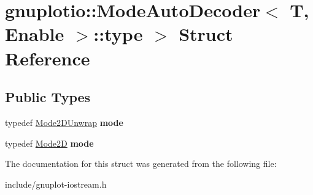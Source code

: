 \hypertarget{structgnuplotio_1_1ModeAutoDecoder_1_1type_01_4}{}\section{gnuplotio\+:\+:Mode\+Auto\+Decoder$<$ T, Enable $>$\+:\+:type $>$ Struct Reference}
\label{structgnuplotio_1_1ModeAutoDecoder_1_1type_01_4}
\subsection*{Public Types}
\begin{DoxyCompactItemize}
\item 
\mbox{\label{structgnuplotio_1_1ModeAutoDecoder_1_1type_01_4_ad1942745c810b24503495c6ade6bd9f6}} 
typedef \hyperlink{structgnuplotio_1_1Mode2DUnwrap}{Mode2\+D\+Unwrap} {\bfseries mode}
\item 
\mbox{\label{structgnuplotio_1_1ModeAutoDecoder_1_1type_01_4_a07e8af1d93e8107efb7be6fd68b0024c}} 
typedef \hyperlink{structgnuplotio_1_1Mode2D}{Mode2D} {\bfseries mode}
\end{DoxyCompactItemize}


The documentation for this struct was generated from the following file\+:\begin{DoxyCompactItemize}
\item 
include/gnuplot-\/iostream.\+h\end{DoxyCompactItemize}

